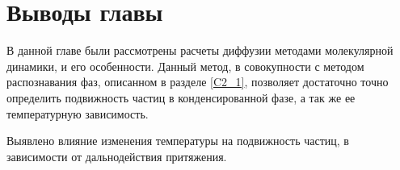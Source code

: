 



\section{Выводы главы}\label{C3_3}

В данной главе были рассмотрены расчеты диффузии методами молекулярной динамики, и его особенности. Данный метод, в совокупности с методом распознавания фаз, описанном в разделе \ref{C2_1}, позволяет достаточно точно определить подвижность частиц в конденсированной фазе, а так же ее температурную зависимость.

Выявлено влияние изменения температуры на подвижность частиц, в зависимости от дальнодействия притяжения.

